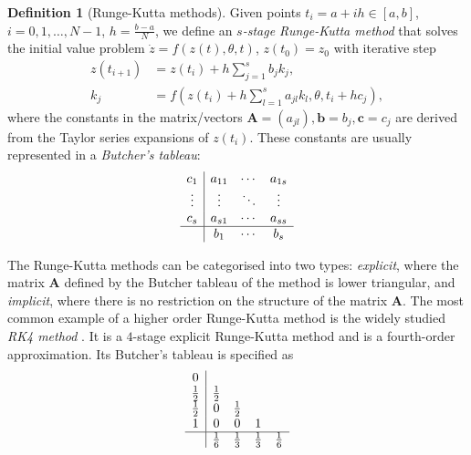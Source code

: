 \documentclass[a4paper,11pt,titlepage]{article}
\theoremstyle{definition}
\newtheorem{definition}{Definition}[section]
\theoremstyle{plain}
\theoremstyle{remark}
\begin{document}
\begin{definition}[Runge-Kutta methods]
    Given points $t_i = a + ih \in \left[a, b\right]$, $i = 0, 1, \dots, N - 1$, $h = \frac{b-a}{N}$, we define an $s$\textit{-stage Runge-Kutta method} that solves the initial value problem $\dot{z}= f(z(t), \theta,t)$, $z(t_0) = z_0$ with iterative step
    \begin{align*}
        z(t_{i+1}) &= z(t_i) + h\sum_{j=1}^s b_j k_j, \\
        k_j &= f\left(z(t_i) + h\sum_{l=1}^s a_{jl}k_l, \theta, t_i + hc_j\right),
    \end{align*}
    where the constants in the matrix/vectors $\mathbf{A} = (a_{jl}), \mathbf{b} = b_j, \mathbf{c} = c_j$ are derived from the Taylor series expansions of $z(t_i)$. These constants are usually represented in a \textit{Butcher's tableau}:
    \begin{equation*}
        \begin{array}{c|ccc}
            c_1 & a_{11} & \cdots & a_{1s} \\
            \vdots & \vdots & \ddots & \vdots  \\
            c_s & a_{s1} & \cdots & a_{ss} \\
            \hline
            & b_1 & \cdots & b_s
        \end{array}
    \end{equation*}
\end{definition}

The Runge-Kutta methods can be categorised into two types: \textit{explicit}, where the matrix $\mathbf{A}$ defined by the Butcher tableau of the method is lower triangular, and \textit{implicit}, where there is no restriction on the structure of the matrix $\mathbf{A}$. The most common example of a higher order Runge-Kutta method is the widely studied \textit{RK4 method} \cite{rungekuttasolvers}. It is a $4$-stage explicit Runge-Kutta method and is a fourth-order approximation. Its Butcher's tableau is specified as
\begin{equation*}
    \begin{array}{c|cccc}
        0  \\
        \frac{1}{2} & \frac{1}{2} \\
        \frac{1}{2} & 0 & \frac{1}{2} \\
        1 & 0 & 0 & 1 \\
        \hline
        & \frac{1}{6} & \frac{1}{3} & \frac{1}{3} & \frac{1}{6} \\
    \end{array}
\end{equation*}
\end{document}

